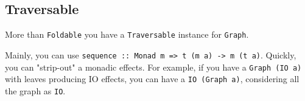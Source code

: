 \documentclass[10pt,a4paper]{article}
\begin{document}
\subsection{Traversable}
More than \verb|Foldable| you have a \verb|Traversable| instance for \verb|Graph|.

Mainly, you can use \verb|sequence :: Monad m => t (m a) -> m (t a)|. Quickly, you can "strip-out" a monadic effects. For example, if you have a \verb|Graph (IO a)| with leaves producing IO effects, you can have a \verb|IO (Graph a)|, considering all the graph as \verb|IO|.
\end{document}
